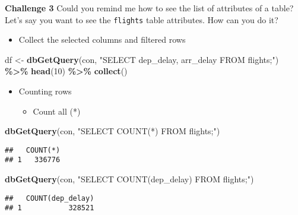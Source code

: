\documentclass[
]{book}
\newenvironment{Shaded}{\begin{snugshade}}{\end{snugshade}}
\newcommand{\DecValTok}[1]{\textcolor[rgb]{0.00,0.00,0.81}{#1}}
\newcommand{\KeywordTok}[1]{\textcolor[rgb]{0.13,0.29,0.53}{\textbf{#1}}}
\newcommand{\NormalTok}[1]{#1}
\newcommand{\OperatorTok}[1]{\textcolor[rgb]{0.81,0.36,0.00}{\textbf{#1}}}
\newcommand{\StringTok}[1]{\textcolor[rgb]{0.31,0.60,0.02}{#1}}
\providecommand{\tightlist}{%
  \setlength{\itemsep}{0pt}\setlength{\parskip}{0pt}}
\begin{document}
\textbf{Challenge 3}
Could you remind me how to see the list of attributes of a table? Let's say you want to see the \texttt{flights} table attributes. How can you do it?

\begin{itemize}
\tightlist
\item
  Collect the selected columns and filtered rows
\end{itemize}

\begin{Shaded}
\begin{Highlighting}[]
\NormalTok{df \textless{}{-}}\StringTok{ }\KeywordTok{dbGetQuery}\NormalTok{(con, }
  \StringTok{"SELECT dep\_delay, arr\_delay FROM flights;"}\NormalTok{) }\OperatorTok{\%\textgreater{}\%}
\StringTok{  }\KeywordTok{head}\NormalTok{(}\DecValTok{10}\NormalTok{) }\OperatorTok{\%\textgreater{}\%}
\StringTok{  }\KeywordTok{collect}\NormalTok{()}
\end{Highlighting}
\end{Shaded}

\begin{itemize}
\item
  Counting rows

  \begin{itemize}
  \tightlist
  \item
    Count all (*)
  \end{itemize}
\end{itemize}

\begin{Shaded}
\begin{Highlighting}[]
\KeywordTok{dbGetQuery}\NormalTok{(con, }
          \StringTok{"SELECT COUNT(*) }
\StringTok{           FROM flights;"}\NormalTok{) }
\end{Highlighting}
\end{Shaded}

\begin{verbatim}
##   COUNT(*)
## 1   336776
\end{verbatim}

\begin{Shaded}
\begin{Highlighting}[]
\KeywordTok{dbGetQuery}\NormalTok{(con, }
           \StringTok{"SELECT COUNT(dep\_delay)}
\StringTok{           FROM flights;"}\NormalTok{)}
\end{Highlighting}
\end{Shaded}

\begin{verbatim}
##   COUNT(dep_delay)
## 1           328521
\end{verbatim}
\end{document}
